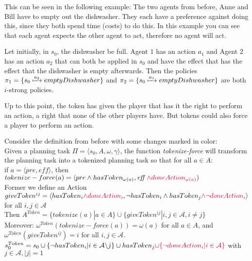 

This can be seen in the following example: The two agents from before, Anne and Bill have to empty out the dishwasher. They each have a preference against doing this, since they both spend time (costs) to do this.
In this example you can see that each agent expects the other agent to act, therefore no agent will act.

Let initially, in $s_0$, the dishwasher be full. Agent $1$ has an action $a_1$ and Agent $2$ has an action $a_2$ that can both be applied in $s_0$ and have the effect that has the effect that the dishwasher is empty afterwards. Then the policies $\pi_1 = \{s_0 \xmapsto{a_2} emptyDishwasher \}$ and $\pi_2 = \{s_0 \xmapsto{a_1} emptyDishwasher \}$ are both $i$-strong policies.


Up to this point, the token has given the player that has it the right to perform an action, a right that none of the other players have. But tokens could also force a player to perform an action.

Consider the definition from before with some changes marked in color: \\
Given a planning task $\Pi = \langle s_0, A, \omega, \gamma \rangle $, the function \textit{tokenize-force} will transform the planning task into a tokenized planning task so that for all $a \in A$: \\
 if $a = \langle pre, \textit{eff} \rangle$, then
   $tokenize-force(a) =\langle pre \wedge hasToken_{\omega(a)}, \textit{eff } {\color{UniRed} \wedge doneAction_{\omega(a)}})$ \\
Former we define an Action
    $ giveToken^{ij} = \langle hasToken_i {\color{UniRed}\wedge doneAction_i}, \neg hasToken_i \wedge hasToken_j {\color{UniRed} \wedge \neg doneAction_i} \rangle $
    for all $i,j \in \mathcal{A}$
    \\
Then $ A^{Token}=\{tokenize(a)|a \in A\} \cup \{giveToken^{ij}|i,j \in \mathcal{A}, i \not = j\}
$ \\
Moreover: $\omega^{Token}(tokenize-force(a))= \omega(a)$ for all $a \in A$,
and $\omega^{Token}(giveToken^{ij}) = i$ for all $i,j \in \mathcal{A}$. \\
$s_0^{Token} = s_0 \cup \{\neg hasToken_i|i \in \mathcal{A} \backslash j\} \cup hasToken_j {\color{UniRed} \cup  \{ \neg doneAction_i| i \in \mathcal{A} \}}$ with $j \in \mathcal{A}, |j|=1$\\

